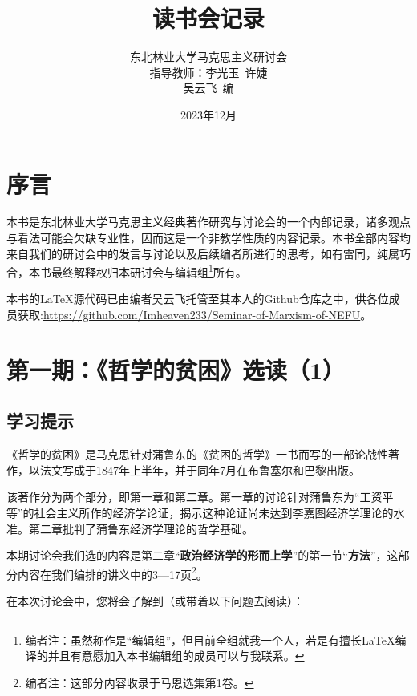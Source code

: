\documentclass[a4paper,twoside,12pt,AutoFakeBold]{ctexart}
\title{读书会记录}
\author{东北林业大学马克思主义研讨会\\
指导教师：李光玉~许婕\\
 吴云飞~编}
\date{2023年12月}
\begin{document}
\maketitle
\newpage



\tableofcontents%

\newpage

\section{序言}

\begin{adjustwidth}{2em}{2em}
\qquad\fangsong 
本书是东北林业大学马克思主义经典著作研究与讨论会的一个内部记录，诸多观点与看法可能会欠缺专业性，因而这是一个非教学性质的内容记录。本书全部内容均来自我们的研讨会中的发言与讨论以及后续编者所进行的思考，如有雷同，纯属巧合，本书最终解释权归本研讨会与编辑组\footnote{编者注：虽然称作是“编辑组”，但目前全组就我一个人，若是有擅长\LaTeX{}编译的并且有意愿加入本书编辑组的成员可以与我联系。}所有。

本书的\LaTeX{}源代码已由编者吴云飞托管至其本人的Github仓库之中，供各位成员获取:\url{https://github.com/Imheaven233/Seminar-of-Marxism-of-NEFU}。

\end{adjustwidth}




\newpage

\section{第一期：《哲学的贫困》选读（1）}

\subsection{学习提示}\label{sec:1}

《哲学的贫困》是马克思针对蒲鲁东的《贫困的哲学》一书而写的一部论战性著作，以法文写成于1847年上半年，并于同年7月在布鲁塞尔和巴黎出版。

该著作分为两个部分，即第一章和第二章。第一章的讨论针对蒲鲁东为“工资平等”的社会主义所作的经济学论证，揭示这种论证尚未达到李嘉图经济学理论的水准。第二章批判了蒲鲁东经济学理论的哲学基础。

本期讨论会我们选的内容是第二章“\textbf{政治经济学的形而上学}”的第一节“\textbf{方法}”，这部分内容在我们编排的讲义中的3—17页\footnote{编者注：这部分内容收录于马恩选集第1卷。}。

在本次讨论会中，您将会了解到（或带着以下问题去阅读）：
\end{document}
